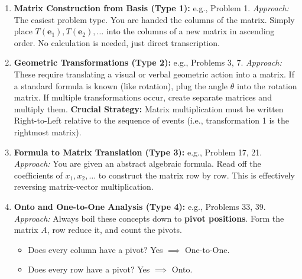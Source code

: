 \documentclass[11pt]{article}
\begin{document}
\begin{enumerate}
    \item \textbf{Matrix Construction from Basis (Type 1):} e.g., Problem 1.
    \textit{Approach:} The easiest problem type. You are handed the columns of the matrix. Simply place $T(\mathbf{e}_1), T(\mathbf{e}_2), \dots$ into the columns of a new matrix in ascending order. No calculation is needed, just direct transcription.
    
    \item \textbf{Geometric Transformations (Type 2):} e.g., Problems 3, 7.
    \textit{Approach:} These require translating a visual or verbal geometric action into a matrix. If a standard formula is known (like rotation), plug the angle $\theta$ into the rotation matrix. If multiple transformations occur, create separate matrices and multiply them. \textbf{Crucial Strategy:} Matrix multiplication must be written Right-to-Left relative to the sequence of events (i.e., transformation 1 is the rightmost matrix).
    
    \item \textbf{Formula to Matrix Translation (Type 3):} e.g., Problem 17, 21.
    \textit{Approach:} You are given an abstract algebraic formula. Read off the coefficients of $x_1, x_2, \dots$ to construct the matrix row by row. This is effectively reversing matrix-vector multiplication.
    
    \item \textbf{Onto and One-to-One Analysis (Type 4):} e.g., Problems 33, 39.
    \textit{Approach:} Always boil these concepts down to \textbf{pivot positions}. Form the matrix $A$, row reduce it, and count the pivots. 
    \begin{itemize}
        \item Does every column have a pivot? Yes $\implies$ One-to-One.
        \item Does every row have a pivot? Yes $\implies$ Onto.
    \end{itemize}
\end{enumerate}
\end{document}
